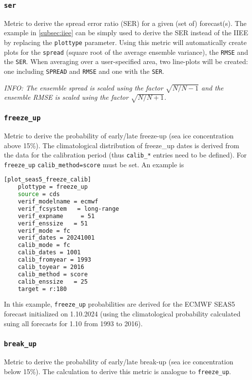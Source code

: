 \documentclass[DIV=10, parskip=full]{scrreprt}
\newcommand{\info}[1]{\textit{INFO: #1}}
\begin{document}
\subsubsection{\texttt{ser}}
\label{subsubsec:ser}
Metric to derive the spread error ratio (SER) for a given (set of) forecast(s). The example in \ref{subsec:iiee} can be simply used to derive the SER instead of the IIEE by replacing the \texttt{plottype} parameter. Using this metric will automatically create plots for the \texttt{spread} (square root of the average ensemble variance), the \texttt{RMSE} and the \texttt{SER}. When averaging over a user-specified area, two line-plots will be created: one including \texttt{SPREAD} and \texttt{RMSE} and one with the \texttt{SER}.

\info{The ensemble spread is scaled using the factor $\sqrt{N/N-1}$ and the ensemble RMSE is scaled using the factor $\sqrt{N/N+1}$.}

\subsubsection{\texttt{freeze\_up}}
Metric to derive the probability of early/late freeze-up (sea ice concentration above 15\%). The climatological distribution of freeze\_up dates is derived from the data for the calibration period (thus \texttt{calib\_*} entries need to be defined). For \texttt{freeze\_up} \texttt{calib\_method=score} must be set. An example is

\begin{lstlisting}[language=bash]
[plot_seas5_freeze_calib]
	plottype = freeze_up
	source = cds
	verif_modelname = ecmwf
	verif_fcsystem   = long-range
	verif_expname     = 51
	verif_enssize   = 51
	verif_mode = fc
	verif_dates = 20241001
	calib_mode = fc
	calib_dates = 1001
	calib_fromyear = 1993
	calib_toyear = 2016
	calib_method = score
	calib_enssize   = 25
	target = r:180
\end{lstlisting}

In this example, \texttt{freeze\_up} probabilities are derived for the ECMWF SEAS5 forecast initialized on 1.10.2024 (using the climatological probability calculated suing all forecasts for 1.10 from 1993 to 2016). 

\subsubsection{\texttt{break\_up}}
Metric to derive the probability of early/late break-up (sea ice concentration below 15\%). The calculation to derive this metric is analogue to \texttt{freeze\_up}.
\end{document}
